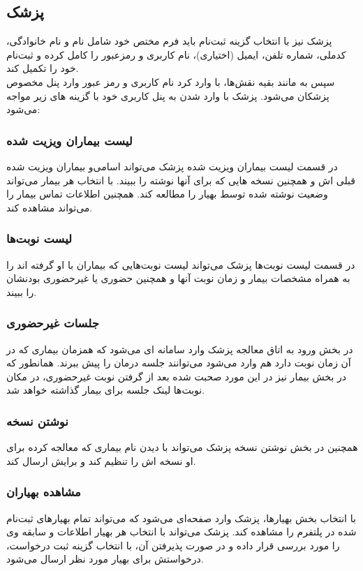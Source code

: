 \documentclass[a4paper]{article}
\begin{document}
	\subsection{پزشک}

پزشک نیز با انتخاب گزینه ثبت‌نام باید فرم مختص خود شامل نام و نام خانوادگی، کدملی، شماره تلفن، ایمیل (اختیاری)، نام کاربری و رمز‌عبور را کامل کرده و ثبت‌نام خود را تکمیل کند.\\
سپس به مانند بقیه نقش‌ها، با وارد کرد نام کاربری و رمز عبور وارد پنل مخصوص پزشکان می‌شود.
پزشک با وارد شدن به پنل کاربری خود با گزینه های زیر مواجه می‌شود:
		
		\subsubsection{لیست بیماران ویزیت شده}
		در قسمت لیست بیماران ویزیت شده پزشک می‌تواند اسامی‌و بیماران ویزیت شده قبلی اش و همچنین نسخه هایی که برای آنها نوشته را ببیند.
		با انتخاب هر بیمار می‌تواند وضعیت نوشته شده توسط بهیار را مطالعه کند. همچنین اطلاعات تماس بیمار را می‌تواند مشاهده کند.
		\subsubsection{لیست نوبت‌ها}
		در قسمت لیست نوبت‌ها پزشک می‌تواند لیست نوبت‌هایی که بیماران با او گرفته اند را به همراه مشخصات بیمار و زمان نوبت آنها و همچنین حضوری یا غیرحضوری بودنشان را ببیند.
		\subsubsection{جلسات غیرحضوری}
		در بخش ورود به اتاق معالجه پزشک وارد سامانه ای می‌شود که همزمان بیماری که در آن زمان نوبت دارد هم وارد می‌شود می‌توانند جلسه درمان را پیش ببرند. همانطور که در بخش بیمار نیز در این مورد صحبت شده بعد از گرفتن نوبت غیرحضوری، در مکان نوبت‌ها لینک جلسه برای بیمار گذاشته خواهد شد.
		\subsubsection{نوشتن نسخه}
		همچنین در بخش نوشتن نسخه پزشک می‌تواند با دیدن نام بیماری که معالجه کرده برای او نسخه اش را تنظیم کند و برایش ارسال کند.
		\subsubsection{مشاهده بهیاران}
		با انتخاب بخش بهیار‌ها، پزشک وارد صفحه‌ای می‌شود که می‌تواند تمام بهیار‌های ثبت‌نام شده در پلتفرم را مشاهده کند. پزشک می‌تواند با انتخاب هر بهیار اطلاعات و سابقه وی را مورد بررسی قرار داده و در صورت پذیرفتن آن، با انتخاب گزینه ثبت درخواست، درخواستش برای بهیار مورد نظر ارسال می‌شود.\\
\end{document}
